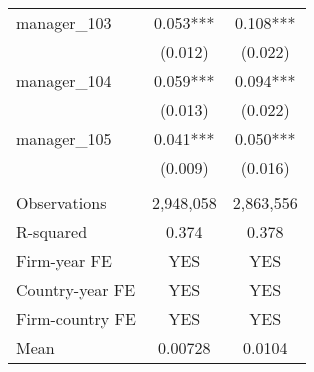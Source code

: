 \begin{tabular}{lcc}
manager\_103 & 0.053*** & 0.108*** \\
 & (0.012) & (0.022) \\
manager\_104 & 0.059*** & 0.094*** \\
 & (0.013) & (0.022) \\
manager\_105 & 0.041*** & 0.050*** \\
 & (0.009) & (0.016) \\
 &  &  \\
Observations & 2,948,058 & 2,863,556 \\
R-squared & 0.374 & 0.378 \\
Firm-year FE & YES & YES \\
Country-year FE & YES & YES \\
Firm-country FE & YES & YES \\
 Mean & 0.00728 & 0.0104 \\ \hline
\end{tabular}
